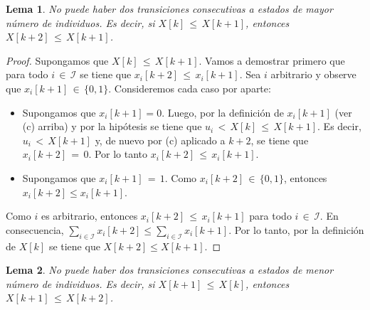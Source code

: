 \documentclass{article}
\newtheorem{lema}{Lema}
\begin{document}
\begin{lema}\label{lema1}
No puede haber dos transiciones consecutivas a estados de mayor número de individuos. Es decir, si $X[k]\,{\leq}\,X[k{+}1]$, entonces $X[k{+}2]\,{\leq}\, X[k{+}1]$.
\end{lema}
\begin{proof}
Supongamos que $X[k]\,{\leq}\,X[k{+}1]$. Vamos a demostrar primero que para todo $i\,{\in}\,\mathcal{I}$ se tiene que $x_i[k{+}2]\,{\leq}\, x_i[k{+}1]$. Sea $i$ arbitrario y observe que $x_i[k{+}1]\,{\in}\,\{0, 1\}$. Consideremos cada caso por aparte:
%
\begin{itemize}
\item Supongamos que $x_i[k{+}1]=0$. Luego, por la definición de $x_i[k{+}1]$ (ver (c) arriba) y por la hipótesis se tiene que $u_i\,{<}\,X[k]\,{\leq}\,X[k{+}1]$. Es decir, $u_i\,{<}\,X[k{+}1]$ y, de nuevo por (c) aplicado a $k{+}2$, se tiene que $x_i[k{+}2]\,{=}\,0$. Por lo tanto $x_i[k{+}2]\,{\leq}\,x_i[k{+}1]$.
\item Supongamos que $x_i[k{+}1]\,{=}\,1$. Como $x_i[k{+}2]\,{\in}\,\{0,1\}$, entonces $x_i[k{+}2]\leq x_i[k{+}1]$.
\end{itemize}
%
Como $i$ es arbitrario, entonces $x_i[k{+}2]\,{\leq}\, x_i[k{+}1]$ para todo $i\,{\in}\,\mathcal{I}$. En consecuencia, $\sum_{i\in\mathcal{I}} x_i[k{+}2]\leq \sum_{i\in\mathcal{I}} x_i[k{+}1]$. Por lo tanto, por la definición de $X[k]$ se tiene que $X[k{+}2]\leq X[k{+}1]$.
\end{proof}

\begin{lema}\label{lema2}
No puede haber dos transiciones consecutivas a estados de menor número de individuos. Es decir, si $X[k{+}1]\,{\leq}\,X[k]$, entonces $X[k{+}1]\,{\leq}\, X[k{+}2]$.
\end{lema}
\end{document}
